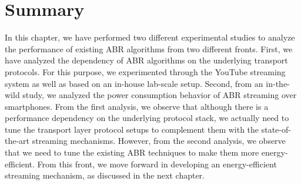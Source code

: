 \section{Summary}
\label{sec:chap03:summary}
In this chapter, we have performed two different experimental studies to analyze the performance of existing \ac{ABR} algorithms from two different fronts. First, we have analyzed the dependency of \ac{ABR} algorithms on the underlying transport protocols. For this purpose, we experimented through the YouTube streaming system as well as based on an in-house lab-scale setup. Second, from an in-the-wild study, we analyzed the power consumption behavior of \ac{ABR} streaming over smartphones. From the first analysis, we observe that although there is a performance dependency on the underlying protocol stack, we actually need to tune the transport layer protocol setups to complement them with the state-of-the-art streaming mechanisms. However, from the second analysis, we observe that we need to tune the existing \ac{ABR} techniques to make them more energy-efficient. From this front, we move forward in developing an energy-efficient streaming mechanism, as discussed in the next chapter.